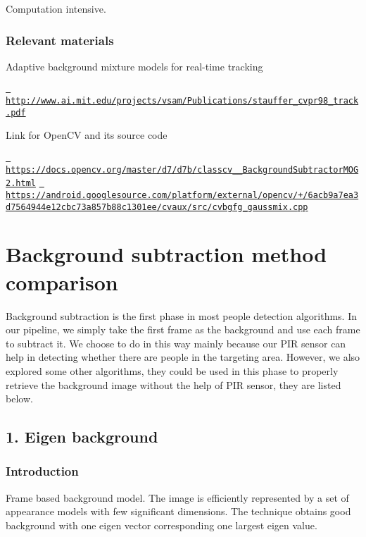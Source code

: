 Computation intensive.

\subsubsection*{Relevant materials}

Adaptive background mixture models for real-\/time tracking

\href{http://www.ai.mit.edu/projects/vsam/Publications/stauffer_cvpr98_track.pdf}{\texttt{ http\+://www.\+ai.\+mit.\+edu/projects/vsam/\+Publications/stauffer\+\_\+cvpr98\+\_\+track.\+pdf}}

Link for Open\+CV and its source code

\href{https://docs.opencv.org/master/d7/d7b/classcv_1_1BackgroundSubtractorMOG2.html}{\texttt{ https\+://docs.\+opencv.\+org/master/d7/d7b/classcv\+\_\+\_\+Background\+Subtractor\+M\+O\+G2.\+html}} \href{https://android.googlesource.com/platform/external/opencv/+/6acb9a7ea3d7564944e12cbc73a857b88c1301ee/cvaux/src/cvbgfg_gaussmix.cpp}{\texttt{ https\+://android.\+googlesource.\+com/platform/external/opencv/+/6acb9a7ea3d7564944e12cbc73a857b88c1301ee/cvaux/src/cvbgfg\+\_\+gaussmix.\+cpp}}

\section*{Background subtraction method comparison}

Background subtraction is the first phase in most people detection algorithms. In our pipeline, we simply take the first frame as the background and use each frame to subtract it. We choose to do in this way mainly because our P\+IR sensor can help in detecting whether there are people in the targeting area. However, we also explored some other algorithms, they could be used in this phase to properly retrieve the background image without the help of P\+IR sensor, they are listed below.

\subsection*{1. Eigen background}

\subsubsection*{Introduction}

Frame based background model. The image is efficiently represented by a set of appearance models with few significant dimensions. The technique obtains good background with one eigen vector corresponding one largest eigen value.

